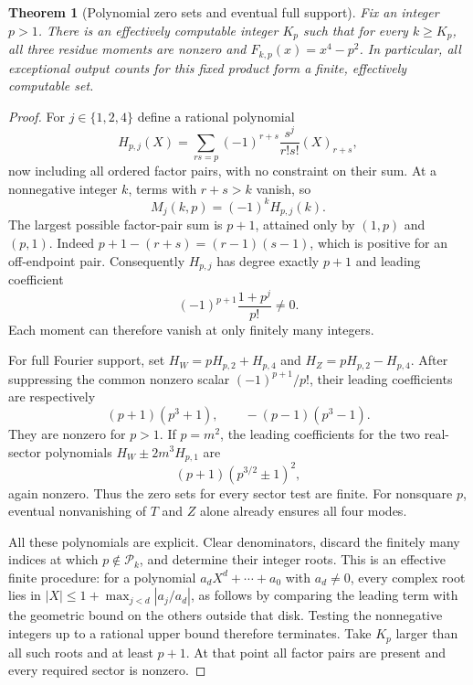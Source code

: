 \documentclass[11pt,a4paper]{article}
\numberwithin{equation}{section}
\newtheorem{theorem}{Theorem}[section]
\theoremstyle{definition}
\theoremstyle{remark}
\newcommand{\fall}[2]{(#1)_{#2}}
\begin{document}
\begin{theorem}[Polynomial zero sets and eventual full support]\label{sc:thm:fixedp}
Fix an integer $p>1$. There is an effectively computable integer $K_p$
such that for every $k\ge K_p$, all three residue moments are nonzero
and $F_{k,p}(x)=x^4-p^2$. In particular, all exceptional output counts
for this fixed product form a finite, effectively computable set.
\end{theorem}
\begin{proof}
For $j\in\{1,2,4\}$ define a rational polynomial
\begin{equation}\label{sc:eq:Hpolynomial}
 H_{p,j}(X)=\sum_{rs=p}(-1)^{r+s}\frac{s^j}{r!s!}\fall X{r+s},
\end{equation}
now including all ordered factor pairs, with no constraint on their sum.
At a nonnegative integer $k$, terms with $r+s>k$ vanish, so
\begin{equation}\label{sc:eq:Hidentity}
 M_j(k,p)=(-1)^k H_{p,j}(k).
\end{equation}
The largest possible factor-pair sum is $p+1$, attained only by
$(1,p)$ and $(p,1)$. Indeed
$p+1-(r+s)=(r-1)(s-1)$, which is positive for an off-endpoint pair.
Consequently $H_{p,j}$ has degree exactly $p+1$ and leading coefficient
\begin{equation}\label{sc:eq:Hleading}
 (-1)^{p+1}\frac{1+p^j}{p!}\ne0.
\end{equation}
Each moment can therefore vanish at only finitely many integers.

For full Fourier support, set
$H_W=pH_{p,2}+H_{p,4}$ and $H_Z=pH_{p,2}-H_{p,4}$.
After suppressing the common nonzero scalar $(-1)^{p+1}/p!$, their
leading coefficients are respectively
\begin{equation}\label{sc:eq:WZleading}
 (p+1)(p^3+1),\qquad -(p-1)(p^3-1).
\end{equation}
They are nonzero for $p>1$. If $p=m^2$, the leading coefficients for
the two real-sector polynomials $H_W\pm2m^3H_{p,1}$ are
\begin{equation}\label{sc:eq:squareleading}
 (p+1)(p^{3/2}\pm1)^2,
\end{equation}
again nonzero. Thus the zero sets for every sector test are finite.
For nonsquare $p$, eventual nonvanishing of $T$ and $Z$ alone already
ensures all four modes.

All these polynomials are explicit. Clear denominators, discard the
finitely many indices at which $p\notin\mathcal P_k$, and determine their integer
roots. This is an effective finite procedure: for a polynomial
$a_dX^d+\cdots+a_0$ with $a_d\ne0$, every complex root lies in
$|X|\le1+\max_{j<d}|a_j/a_d|$, as follows by comparing the leading term
with the geometric bound on the others outside that disk. Testing the
nonnegative integers up to a rational upper bound therefore terminates.
Take $K_p$ larger than all such roots and at least $p+1$. At that point
all factor pairs are present and every required sector is nonzero.
\end{proof}
\end{document}
